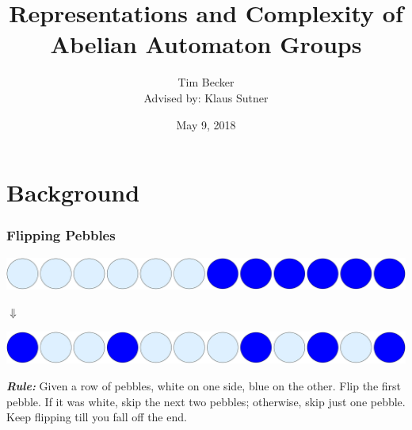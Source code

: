 \documentclass{beamer}
\title[Abelian Automaton Groups]
{Representations and Complexity of Abelian Automaton Groups}
\author[Tim Becker]{Tim Becker\texorpdfstring{\\{\small
            Advised by: Klaus Sutner}}{}}
\institute{Carnegie Mellon University}
\date{May 9, 2018}
\begin{document}

\begin{frame}
    \titlepage
\end{frame}

\section{Background}

\begin{frame}
\frametitle{Flipping Pebbles}
\begin{center}
    \includegraphics[scale=.1]{./pebbles-1}
\end{center}

\begin{center}
  {\LARGE\textbf{$\Downarrow$}}
\end{center}

\begin{center}
    \includegraphics[scale=.1]{./pebbles-2}
\end{center}

\vspace{.5cm}

{\bf \emph{Rule:}}
Given a row of pebbles, white on one side, blue on the other.  Flip the first
pebble.  If it was white, skip the next two pebbles; otherwise, skip just one
pebble.  Keep flipping till you fall off the end.

\end{frame}
\end{document}
